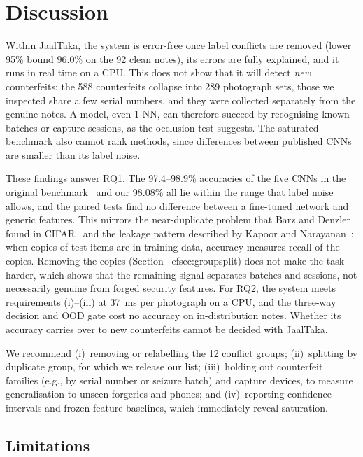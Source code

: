 \documentclass[pdflatex,iicol,sn-mathphys-num]{sn-jnl}
\begin{document}
\section{Discussion}\label{sec:discussion}

Within JaalTaka, the system is error-free once label conflicts are removed (lower 95\%
bound 96.0\% on the 92 clean notes), its errors are fully explained, and it runs in real
time on a CPU. This does not show that it will detect \emph{new} counterfeits: the 588
counterfeits collapse into 289 photograph sets, those we inspected share a few serial
numbers, and they were collected separately from the genuine notes. A model, even 1-NN,
can therefore succeed by recognising known batches or capture sessions, as the occlusion
test suggests. The saturated benchmark also cannot rank methods, since differences
between published CNNs are smaller than its label noise.

These findings answer RQ1. The 97.4--98.9\% accuracies of the five CNNs in the original
benchmark~\cite{piyas2025jaaltaka} and our 98.08\% all lie within the range that label
noise allows, and the paired tests find no difference between a fine-tuned network and
generic features. This mirrors the near-duplicate problem that Barz and Denzler found in
CIFAR~\cite{barz2020cifair} and the leakage pattern described by Kapoor and
Narayanan~\cite{kapoor2023leakage}: when copies of test items are in training data,
accuracy measures recall of the copies. Removing the copies
(Section~
ef{sec:groupsplit}) does not make the task harder, which shows that the
remaining signal separates batches and sessions, not necessarily genuine from forged
security features. For RQ2, the system meets requirements
(i)--(iii) at 37~ms per photograph on a CPU, and the three-way decision and OOD gate cost
no accuracy on in-distribution notes. Whether its accuracy carries over to new
counterfeits cannot be decided with JaalTaka.

We recommend (i)~removing or relabelling the 12 conflict groups; (ii)~splitting by
duplicate group, for which we release our list; (iii)~holding out counterfeit families
(e.g., by serial number or seizure batch) and capture devices, to measure generalisation
to unseen forgeries and phones; and (iv)~reporting confidence intervals and
frozen-feature baselines, which immediately reveal saturation.

\subsection{Limitations}\label{sec:limits}
\end{document}
